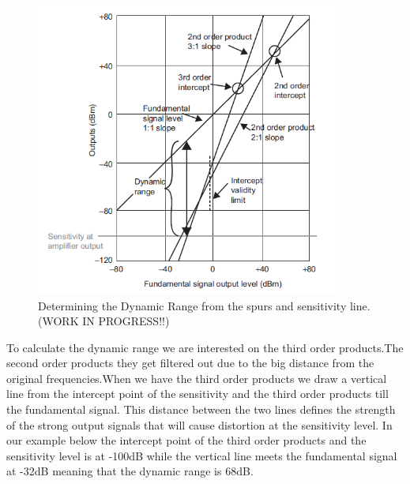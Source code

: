 \begin{figure}[H]
\centering
\includegraphics[width=0.90\textwidth]{figures/Dynamic_range_calc.png}
\caption{Determining the Dynamic Range from the spurs and sensitivity line.(WORK IN PROGRESS!!)}
\label{Dynamic_range_calc}
\end{figure}
To calculate the dynamic range we are interested on the third order products.The second order products they get filtered out due to the big distance from the original frequencies.When we have the third order products we draw a vertical line from the intercept point of the sensitivity and the third order products till the fundamental signal. This distance between the two lines defines the strength of the strong output signals that will cause distortion at the sensitivity level. In our example below the intercept point of the third order products and the sensitivity level is at -100dB while the vertical line meets the fundamental signal at -32dB meaning that the dynamic range is 68dB. 

